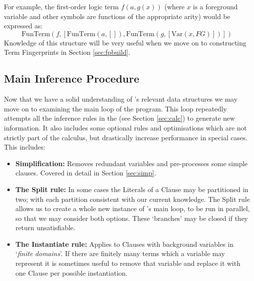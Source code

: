 For example, the first-order logic term $f(a, g(x))$ (where $x$ is a foreground
variable and other symbols are functions of the appropriate arity) would be expressed as:
\[\text{FunTerm}(f, [\text{FunTerm}(a, []), \text{FunTerm}(g, [\text{Var}(x, FG)])] )\]
Knowledge of this structure will be very useful when we move on to constructing
Term Fingerprints in Section \ref{sec:fpbuild}.

\subsection{Main Inference Procedure}
\label{sec:mloop}

Now that we have a solid understanding of \beagle's relevant data structures
we may move on to examining the main loop of the program. This loop repeatedly
attempts all the inference rules in the {\HSWAC} (see Section \ref{sec:calc})
to generate new information. It also includes some optional rules and optimisations
which are not strictly part of the calculus, but drastically increase performance
in special cases. This includes:
\begin{itemize}
\item \textbf{Simplification:} Removes redundant variables and pre-processes some simple clauses.
Covered in detail in Section \ref{sec:simp}.
\item \textbf{The Split rule:} In some cases the Literals of a Clause may be partitioned
in two; with each partition consistent with our current knowledge. The Split rule allows
us to create a whole new instance of \beagle's main loop, to be run in parallel,
so that we may consider both options. These `branches' may be closed if they return
unsatisfiable.
\item \textbf{The Instantiate rule:} Applies to Clauses with background variables in `\emph{finite domains}'.
If there are finitely many terms which a variable may represent it is sometimes useful
to remove that variable and replace it with one Clause per possible instantiation.
\end{itemize}

